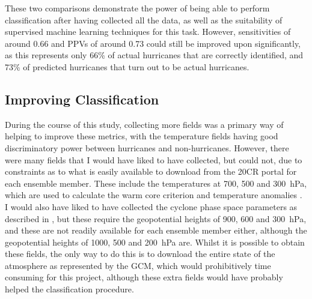 \documentclass[pdftex,12pt,a4paper]{report}
\begin{document}
These two comparisons demonstrate the power of being able to perform classification after having
collected all the data, as well as the suitability of supervised machine learning techniques for
this task. However, sensitivities of around \SI{0.66}{} and PPVs of around \SI{0.73}{} could still
be improved upon significantly, as this represents only 66\% of actual hurricanes that are correctly
identified, and 73\% of predicted hurricanes that turn out to be actual hurricanes. 

\subsection{Improving Classification}
\label{sec:improving_classification}
During the course of this study, collecting more fields was a primary way of helping to improve
these metrics, with the temperature fields having good discriminatory power between hurricanes and
non-hurricanes.  However, there were many fields that I would have liked to have collected, but
could not, due to constraints as to what is easily available to download from the 20CR portal for
each ensemble member. These include the temperatures at \SI{700}{}, \SI{500}{} and \SI{300}{hPa},
which are used to calculate the warm core criterion and temperature anomalies
\parencite{bengtsson1995hurricane, bengtsson1996will, walsh1997objective, yoshimura2006influence}. I
would also have liked to have collected the cyclone phase space parameters as described in
\textcite{evans2003objective, hart2003cyclone}, but these require the geopotential heights of
\SI{900}{}, \SI{600}{} and \SI{300}{hPa}, and these are not readily available for each ensemble
member either, although the geopotential heights of \SI{1000}{}, \SI{500}{} and \SI{200}{hPa} are.
Whilst it is possible to obtain these fields, the only way to do this is to download the entire
state of the atmosphere as represented by the GCM, which would prohibitively time consuming for this
project, although these extra fields would have probably helped the classification procedure.
\end{document}
